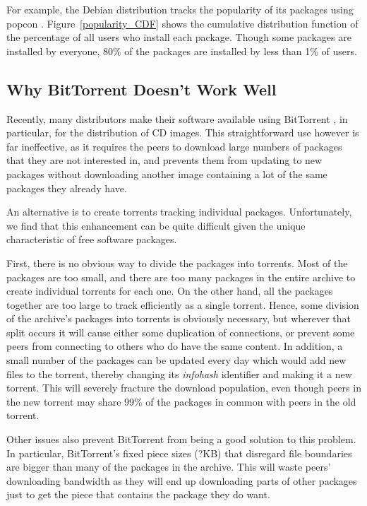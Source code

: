\documentclass[conference]{IEEEtran}
\begin{document}
For example, the Debian distribution tracks the popularity of its
packages using popcon \cite{popcon}. Figure~\ref{popularity_CDF}
shows the cumulative distribution function of the percentage of all
users who install each package. Though some packages are installed
by everyone, 80\% of the packages are installed by less than 1\% of
users.



\subsection{Why BitTorrent Doesn't Work Well}
\label{bittorrent}

Recently, many distributors make their software available using
BitTorrent \cite{COHEN03}, in particular, for the distribution of CD
images. This straightforward use however is far ineffective, as it requires the
peers to download large numbers of packages that they are not
interested in, and prevents them from updating to new packages
without downloading another image containing a lot of the same
packages they already have. 

An alternative is to create torrents tracking individual packages. Unfortunately, we find that this enhancement can be
quite difficult given the unique characteristic of free software packages. 

First, there is no obvious way to divide the packages into torrents.
Most of the packages are too small, and there are too many packages
in the entire archive to create individual torrents for each one.
On the other hand, all the packages together are too large to track
efficiently as a single torrent. Hence, some division of the archive's
packages into torrents is obviously necessary, but wherever that
split occurs it will cause either some duplication of connections,
or prevent some peers from connecting to others who do have the same
content. In addition, a small number of the packages can be updated every
day which would add new files to the torrent, thereby changing its
\emph{infohash} identifier and making it a new torrent. This will
severely fracture the download population, even though peers in the
new torrent may share 99\% of the packages in common with peers in the
old torrent.

Other issues also prevent BitTorrent from being a good solution to
this problem. In particular, BitTorrent's fixed piece sizes (?KB) that disregard file
boundaries are bigger than many of the packages in the archive. This
will waste peers' downloading bandwidth as they will end up
downloading parts of other packages just to get the piece that
contains the package they do want. 
\end{document}
